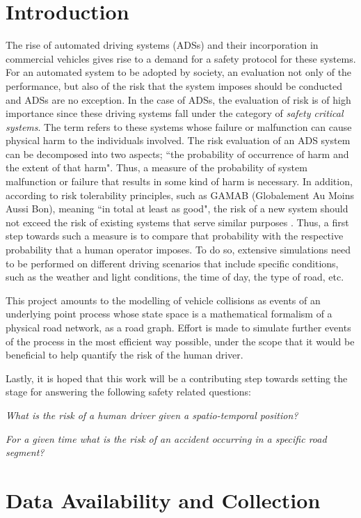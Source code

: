 \documentclass[12pt]{article}
\theoremstyle{definition}
\begin{document}
\section{Introduction} 
The rise of automated driving systems (ADSs) and their incorporation in commercial vehicles gives rise to a demand for a safety protocol for these systems. For an automated system to be adopted by society, an evaluation not only of the performance, but also of the risk that the system imposes should be conducted and ADSs are no exception. In the case of ADSs, the evaluation of risk is of high importance since these driving systems fall under the category of \emph{safety critical systems}. The term refers to these systems whose failure or malfunction can cause physical harm to the individuals involved. The risk evaluation of an ADS system can be decomposed into two aspects; ``the probability of occurrence of harm and the extent of that harm"\cite{risk}. Thus, a measure of the probability of system malfunction or failure that results in some kind of harm is necessary. In addition, according to risk tolerability principles, such as GAMAB (Globalement Au Moins Aussi Bon), meaning ``in total at least as good", the risk of a new system should not exceed the risk of existing systems that serve similar purposes \cite{riskGAME}. 
Thus, a first step towards such a measure is to compare that probability with the respective probability that a human operator imposes. To do so, extensive simulations need to be performed on different driving scenarios that include specific conditions, such as the weather and light conditions, the time of day, the type of road, etc. 
 
This project amounts to the modelling of vehicle collisions as events of an underlying point process whose state space is a mathematical formalism of a physical road network, as a road graph. Effort is made to simulate further events of the process in the most efficient way possible, under the scope that it would be beneficial to help quantify the risk of the human driver. 

Lastly, it is hoped that this work will be a contributing step towards setting the stage for answering the following safety related questions:

\textit{What is the risk of a human driver given a spatio-temporal position?}

\textit{For a given time what is the risk of an accident occurring in a specific road segment?}


\section{Data Availability and Collection}
\end{document}
